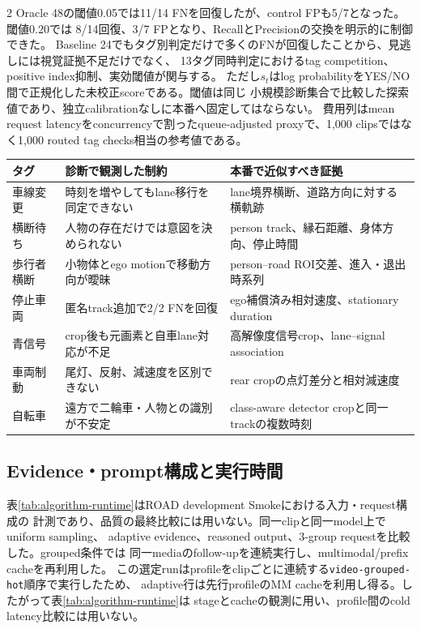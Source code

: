 \documentclass[9pt,a4paper]{extarticle}
\begin{document}
\begin{multicols}{2}
Oracle 48の閾値0.05では11/14 FNを回復したが、control FPも5/7となった。閾値0.20では
8/14回復、3/7 FPとなり、RecallとPrecisionの交換を明示的に制御できた。
Baseline 24でもタグ別判定だけで多くのFNが回復したことから、見逃しには視覚証拠不足だけでなく、
13タグ同時判定におけるtag competition、positive index抑制、実効閾値が関与する。
ただし$s_t$はlog probabilityをYES/NO間で正規化した未校正scoreである。閾値は同じ
小規模診断集合で比較した探索値であり、独立calibrationなしに本番へ固定してはならない。
費用列はmean request latencyをconcurrencyで割ったqueue-adjusted
proxyで、1,000 clipsではなく1,000 routed tag checks相当の参考値である。

\begin{center}
\label{tab:recall-tag-diagnosis}
\scriptsize
\begin{tabularx}{\columnwidth}{l>{\raggedright\arraybackslash}X>{\raggedright\arraybackslash}X}
\toprule
タグ & 診断で観測した制約 & 本番で近似すべき証拠\\
\midrule
車線変更 & 時刻を増やしてもlane移行を同定できない &
lane境界横断、道路方向に対する横軌跡\\
横断待ち & 人物の存在だけでは意図を決められない &
person track、縁石距離、身体方向、停止時間\\
歩行者横断 & 小物体とego motionで移動方向が曖昧 &
person--road ROI交差、進入・退出時系列\\
停止車両 & 匿名track追加で2/2 FNを回復 &
ego補償済み相対速度、stationary duration\\
青信号 & crop後も元画素と自車lane対応が不足 &
高解像度信号crop、lane--signal association\\
車両制動 & 尾灯、反射、減速度を区別できない &
rear cropの点灯差分と相対減速度\\
自転車 & 遠方で二輪車・人物との識別が不安定 &
class-aware detector cropと同一trackの複数時刻\\
\bottomrule
\end{tabularx}
\end{center}

\subsection{Evidence・prompt構成と実行時間}
表\ref{tab:algorithm-runtime}はROAD development Smokeにおける入力・request構成の
計測であり、品質の最終比較には用いない。同一clipと同一model上でuniform sampling、
adaptive evidence、reasoned output、3-group requestを比較した。grouped条件では
同一mediaのfollow-upを連続実行し、multimodal/prefix cacheを再利用した。
この選定runはprofileをclipごとに連続する\texttt{video-grouped-hot}順序で実行したため、
adaptive行は先行profileのMM cacheを利用し得る。したがって表\ref{tab:algorithm-runtime}は
stageとcacheの観測に用い、profile間のcold latency比較には用いない。
\end{multicols}
\end{document}
